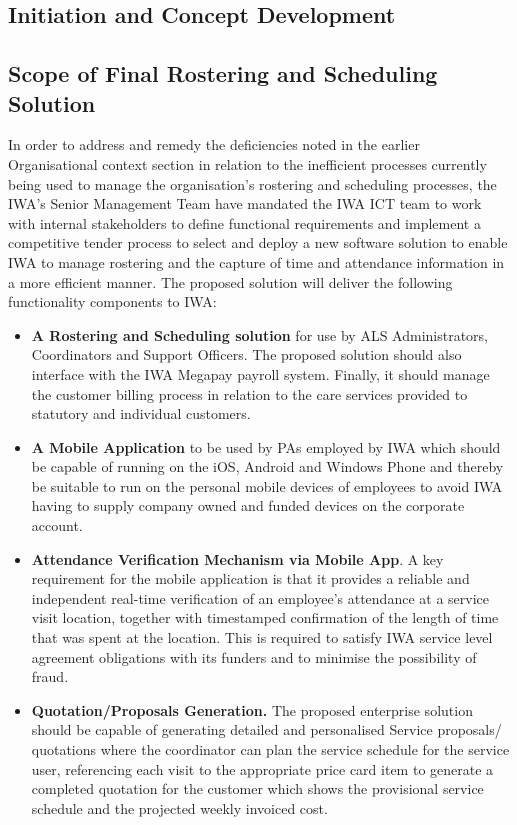 \documentclass[a4paper,12pt]{article}
\begin{document}
\begin{samepage}
\begin{samepage}
\section {Initiation and Concept Development}

\subsection {Scope of Final Rostering and Scheduling Solution}
In order to address and remedy the deficiencies noted in the earlier Organisational context section in relation to the inefficient processes currently being used to manage the organisation's rostering and scheduling processes,  the IWA's Senior Management Team have mandated the IWA ICT team to work with internal stakeholders to define functional requirements and implement a competitive tender process to select and deploy a new software solution to enable IWA to manage rostering and the capture of time and attendance information in a more efficient manner.
The proposed solution will deliver the following functionality components to IWA:
\begin{itemize}
\item \textbf{A Rostering and Scheduling solution} for use by ALS Administrators, Coordinators and Support Officers. The proposed solution should also interface with the IWA Megapay payroll system. Finally, it should manage the customer billing process in relation to the care services provided to statutory and individual customers.
\item \textbf {A Mobile Application} to be used by PAs employed by IWA which should be capable of running on the iOS, Android and Windows Phone and thereby be suitable to run on the personal mobile devices of employees to avoid IWA having to supply company owned and funded devices on the corporate account. 
\item \textbf {Attendance Verification Mechanism via Mobile App}. A key requirement for the mobile application is that it provides a reliable and independent real-time verification of an employee’s attendance at a service visit location, together with timestamped confirmation of the length of time that was spent at the location.  This is required to satisfy IWA service level agreement obligations with its funders and to minimise the possibility of fraud.
\pagebreak
\item\textbf {Quotation/Proposals Generation.} The proposed enterprise solution should be capable of generating detailed and personalised Service proposals/ quotations where the coordinator can plan the service schedule for the service user, referencing each visit to the appropriate price card item to generate a completed quotation for the customer which shows the provisional service schedule and the projected weekly invoiced cost.

\end{itemize}
\end{samepage}
\end{samepage}
\end{document}
